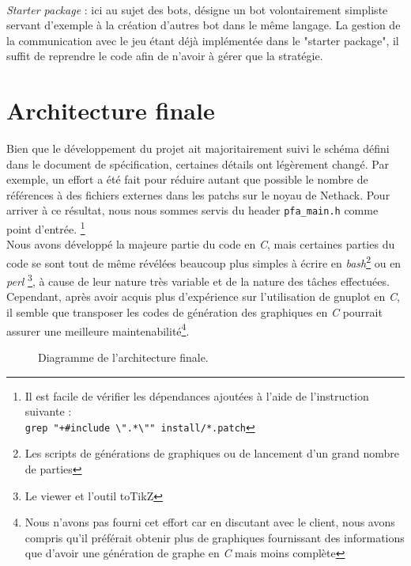 \documentclass[a4paper,12pt]{article}
\begin{document}
\paragraph{}
\emph{Starter package} : ici au sujet des bots, désigne un bot volontairement
simpliste servant d'exemple à la création d'autres bot dans le même langage.
La gestion de la communication avec le jeu étant déjà implémentée dans le
"starter package", il suffit de reprendre le code afin de n'avoir à gérer que
la stratégie.

\section{Architecture finale}

Bien que le développement du projet ait majoritairement suivi le schéma
défini dans le document de spécification, certaines détails ont légèrement
changé. Par exemple, un effort a été fait pour réduire autant que possible
le nombre de références à des fichiers externes dans les patchs sur le noyau
de Nethack. Pour arriver à ce résultat, nous nous sommes servis du header
{\verb|pfa_main.h|} comme point d'entrée.
\footnote{Il est facile de vérifier les dépendances ajoutées à l'aide de
  l'instruction suivante :\\
{\verb*|grep "+#include \".*\"" install/*.patch|}}
\\
Nous avons développé la majeure partie du code en {\em C}, mais certaines
parties du code se sont tout de même révélées beaucoup plus simples à
écrire en {\em bash}\footnote{Les scripts de générations de graphiques ou de
  lancement d'un grand nombre de parties} ou en {\em perl}
\footnote{Le viewer et l'outil toTikZ}, à cause de leur nature très variable
et de la nature des tâches effectuées. Cependant, après avoir acquis plus
d'expérience sur l'utilisation de gnuplot en {\em C}, il semble que transposer
les codes de génération des graphiques en {\em C} pourrait assurer une
meilleure maintenabilité\footnote{Nous n'avons pas fourni cet effort car en
discutant avec le client, nous avons compris qu'il préférait obtenir plus de
graphiques fournissant des informations que d'avoir une génération de graphe
en {\em C} mais moins complète}.

\begin{figure}[H]
	\caption{\label{fig:architecture} Diagramme de l'architecture finale.}
\end{figure}
\end{document}
